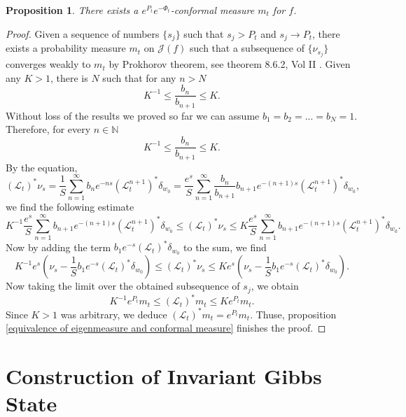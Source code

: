 \documentclass[12pt,reqno]{amsart}
\newtheorem{proposition}[theorem]{Proposition}
\begin{document}
\begin{proposition}\label{conformal measure existence}
    There exists a $e^{P_t}e^{-\Phi_t}$-conformal measure $m_t$ for $f$.
\end{proposition}
\begin{proof}
    Given a sequence of numbers $\{s_j\}$ such that $s_j>P_t$ and $s_j \to P_t$, there exists a probability measure $m_t$ on $\mathcal{J}(f)$ such that a subsequence of $\{ \nu_{s_j}\}$ converges weakly to $m_t$ by Prokhorov theorem, see theorem 8.6.2, Vol II \citep[~ p. 202]{Bogachev}. Given any $K>1$, there is $N$ such that for any $n>N$
    $$ K^{-1} \leq \dfrac{b_n}{b_{n+1}}\leq K.$$
    Without loss of the results we proved so far we can assume $b_1=b_2=...=b_N=1$. Therefore, for every $n\in \mathbb{N}$ 
    $$ K^{-1} \leq \dfrac{b_n}{b_{n+1}}\leq K.$$
    By the equation,
    $$\left(\mathcal{L}_t \right)^*\nu_s =\dfrac{1}{S}\sum_{n=1}^{\infty}b_ne^{-ns}\left(\mathcal{L}_t^{n+1} \right)^*\delta_{w_0}=\dfrac{e^s}{S}\sum_{n=1}^{\infty}\frac{b_n}{b_{n+1}}b_{n+1}e^{-(n+1)s}\left(\mathcal{L}_t^{n+1} \right)^*\delta_{w_0},$$
    we find the following estimate
    $$K^{-1}\dfrac{e^s}{S}\sum_{n=1}^{\infty}b_{n+1}e^{-(n+1)s}\left(\mathcal{L}_t^{n+1} \right)^*\delta_{w_0}\leq \left(\mathcal{L}_t \right)^*\nu_s  \leq K\dfrac{e^s}{S}\sum_{n=1}^{\infty}b_{n+1}e^{-(n+1)s}\left(\mathcal{L}_t^{n+1} \right)^*\delta_{w_0}.$$
    Now by adding the term $b_1e^{-s}\left(\mathcal{L}_t\right)^*\delta_{w_0}$ to the sum, we find
    $$K^{-1}e^s\left( \nu_s - \frac{1}{S}b_1e^{-s}\left(\mathcal{L}_t\right)^*\delta_{w_0}\right)\leq \left(\mathcal{L}_t \right)^*\nu_s \leq Ke^s\left( \nu_s - \frac{1}{S}b_1e^{-s}\left(\mathcal{L}_t\right)^*\delta_{w_0}\right).$$
    Now taking the limit over the obtained subsequence of $s_{j}$, we obtain
    $$K^{-1}e^{P_t}m_t\leq \left(\mathcal{L}_t \right)^*m_t \leq Ke^{P_t}m_t.$$
    Since $K>1$ was arbitrary, we deduce $\left(\mathcal{L}_t \right)^*m_t=e^{P_t}m_t.$ Thuse, proposition \ref{equivalence of eigenmeasure and conformal measure} finishes the proof.
\end{proof}
\section{Construction of Invariant Gibbs State}
\end{document}
